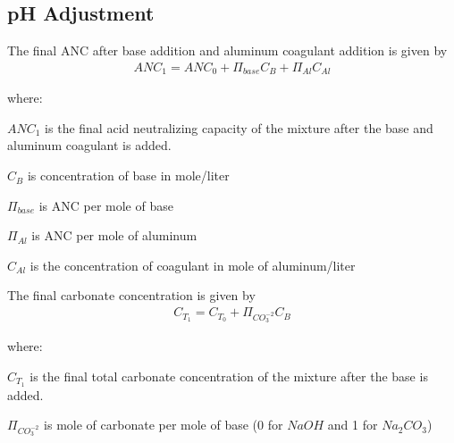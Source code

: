 \documentclass[letterpaper,10pt,english]{sphinxmanual}
\begin{document}
\subsection{pH Adjustment}
\label{\detokenize{Rapid_Mix/RM_Derivations:ph-adjustment}}\label{\detokenize{Rapid_Mix/RM_Derivations:heading-ph-adjustment}}
The final ANC after base addition and aluminum coagulant addition is given by
\begin{equation}\label{equation:Rapid_Mix/RM_Derivations:Rapid_Mix/RM_Derivations:17}
\begin{split}ANC_1 = ANC_0 + \Pi_{base}C_B + \Pi_{Al}C_{Al}\end{split}
\end{equation}
\begin{DUlineblock}{0em}
\item[] where:
\item[] \(ANC_1\) is the final acid neutralizing capacity of the mixture after the base and aluminum coagulant is added.
\item[] \(C_B\) is concentration of base in mole/liter
\item[] \(\Pi_{base}\) is ANC per mole of base
\item[] \(\Pi_{Al}\) is ANC per mole of aluminum
\item[] \(C_{Al}\) is the concentration of coagulant in mole of aluminum/liter
\end{DUlineblock}

The final carbonate concentration is given by
\begin{equation}\label{equation:Rapid_Mix/RM_Derivations:Rapid_Mix/RM_Derivations:18}
\begin{split}C_{T_1} ={C_{T_0}}+ \Pi_{CO_3^{-2}}C_B\end{split}
\end{equation}
\begin{DUlineblock}{0em}
\item[] where:
\item[] \(C_{T_1}\) is the final total carbonate concentration of the mixture after the base is added.
\item[] \(\Pi_{CO_3^{-2}}\) is mole of carbonate per mole of base (0 for \(NaOH\) and 1 for \(Na_2CO_3\))
\end{DUlineblock}
\end{document}
